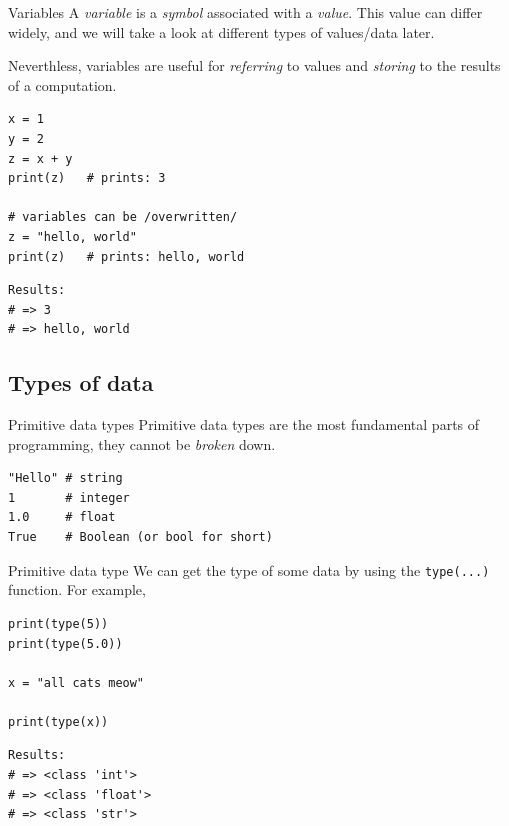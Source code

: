 \documentclass[10pt]{beamer}
\begin{document}
\begin{frame}[label={sec:org14f39ff},fragile]{Variables}
 A \emph{variable} is a \emph{symbol} associated with a \emph{value}. This value can differ widely, and we
will take a look at different types of values/data later.

Neverthless, variables are useful for \emph{referring} to values and \emph{storing} to the results
of a computation.

\begin{verbatim}
x = 1
y = 2
z = x + y
print(z)   # prints: 3

# variables can be /overwritten/
z = "hello, world"
print(z)   # prints: hello, world
\end{verbatim}

\begin{verbatim}
Results: 
# => 3
# => hello, world
\end{verbatim}
\end{frame}

\subsection{Types of data}
\label{sec:org595ee05}

\begin{frame}[label={sec:org34e41d5},fragile]{Primitive data types}
 Primitive data types are the most fundamental parts of programming, they cannot
be \emph{broken} down.

\begin{verbatim}
"Hello" # string
1       # integer
1.0     # float
True    # Boolean (or bool for short)
\end{verbatim}
\end{frame}

\begin{frame}[label={sec:org3ab19aa},fragile]{Primitive data type}
 We can get the type of some data by using the \texttt{type(...)} function. For example,

\begin{verbatim}
print(type(5))
print(type(5.0))

x = "all cats meow"

print(type(x))
\end{verbatim}

\begin{verbatim}
Results: 
# => <class 'int'>
# => <class 'float'>
# => <class 'str'>
\end{verbatim}
\end{frame}
\end{document}
